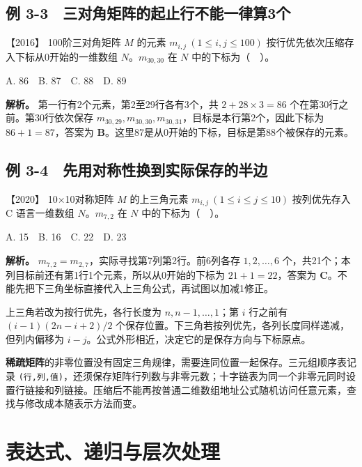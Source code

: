 
\subsection{例 3-3　三对角矩阵的起止行不能一律算3个}\label{ds-ex3-3}

\noindent{}【2016】 100阶三对角矩阵 \(M\) 的元素 \(m_{i,j}\ (1\le i,j\le100)\) 按行优先依次压缩存入下标从0开始的一维数组 \(N\)。\(m_{30,30}\) 在 \(N\) 中的下标为（　）。

A. 86　B. 87　C. 88　D. 89


\textbf{解析。} 第一行有2个元素，第2至29行各有3个，共 \(2+28\times3=86\) 个在第30行之前。第30行依次保存 \(m_{30,29},m_{30,30},m_{30,31}\)，目标是本行第2个，因此下标为 \(86+1=87\)，答案为 \textbf{B}。这里87是从0开始的下标，目标是第88个被保存的元素。

\subsection{例 3-4　先用对称性换到实际保存的半边}\label{ds-ex3-4}

\noindent{}【2020】 10×10对称矩阵 \(M\) 的上三角元素 \(m_{i,j}\ (1\le i\le j\le10)\) 按列优先存入 C 语言一维数组 \(N\)。\(m_{7,2}\) 在 \(N\) 中的下标为（　）。

A. 15　B. 16　C. 22　D. 23


\textbf{解析。} \(m_{7,2}=m_{2,7}\)，实际寻找第7列第2行。前6列各存 \(1,2,\ldots,6\) 个，共21个；本列目标前还有第1行1个元素，所以从0开始的下标为 \(21+1=22\)，答案为 \textbf{C}。不能先把下三角坐标直接代入上三角公式，再试图以加减1修正。

上三角若改为按行优先，各行长度为 \(n,n-1,\ldots,1\)；第 \(i\) 行之前有 \((i-1)(2n-i+2)/2\) 个保存位置。下三角若按列优先，各列长度同样递减，但列内偏移为 \(i-j\)。公式外形相近，决定它的是保存方向与下标原点。

\textbf{稀疏矩阵}的非零位置没有固定三角规律，需要连同位置一起保存。三元组顺序表记录 \allowbreak{}\texttt{(行,}\allowbreak{}\texttt{列,}\allowbreak{}\texttt{值)}，还须保存矩阵行列数与非零元数；十字链表为同一个非零元同时设置行链接和列链接。压缩后不能再按普通二维数组地址公式随机访问任意元素，查找与修改成本随表示方法而变。

\section{表达式、递归与层次处理}\label{ds-03-07}

